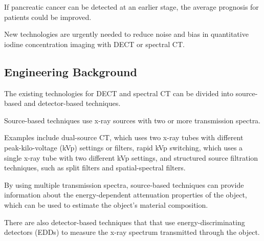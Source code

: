 \documentclass[12pt]{article}
\begin{document}
If pancreatic cancer can be detected at an earlier stage, the average prognosis for patients could be improved.


New technologies are urgently needed to reduce noise and bias in quantitative iodine concentration imaging with DECT or spectral CT. 

\subsection{Engineering Background}
\label{subsec:intro_engineering}


The existing technologies for DECT and spectral CT can be divided into source-based and detector-based techniques.



Source-based techniques use x-ray sources with two or more transmission spectra. 

Examples include dual-source CT, which uses two x-ray tubes with different peak-kilo-voltage (kVp) settings or filters, rapid kVp switching, which uses a single x-ray tube with two different kVp settings, and structured source filtration techniques, such as split filters and spatial-spectral filters. 


By using multiple transmission spectra, source-based techniques can provide information about the energy-dependent attenuation properties of the object, which can be used to estimate the object's material composition.


There are also detector-based techniques that that use energy-discriminating detectors (EDDs) to measure the x-ray spectrum transmitted through the object.
\end{document}
